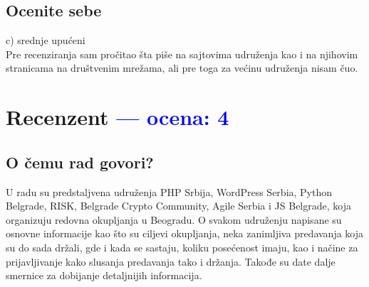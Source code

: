 \documentclass[a4paper]{report}
\newcommand{\odgovor}[1]{\textcolor{blue}{#1}}
\begin{document}
\section{Ocenite sebe}
c) srednje upućeni\\
Pre recenziranja sam pročitao šta piše na sajtovima udruženja kao i na njihovim stranicama na društvenim mrežama, ali pre toga za većinu udruženja nisam čuo.


\chapter{Recenzent \odgovor{--- ocena: 4} }


\section{O čemu rad govori?}
U radu su predstaljvena udruženja PHP Srbija, WordPress Serbia, Python Belgrade, RISK, Belgrade Crypto Community, Agile Serbia i JS Belgrade, koja organizuju redovna okupljanja u Beogradu. O svakom udruženju napisane su osnovne informacije kao što su ciljevi okupljanja, neka zanimljiva predavanja koja su do sada držali, gde i kada se sastaju, koliku posećenost imaju, kao i načine za prijavljivanje kako slusanja predavanja tako i držanja. Takođe su date dalje smernice za dobijanje detaljnijih informacija.
\end{document}
